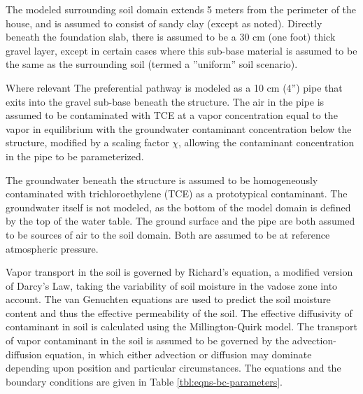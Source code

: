 \documentclass[journal=esthag,manuscript=article]{achemso}
\begin{document}
The modeled surrounding soil domain extends 5 meters from the perimeter of the house, and is assumed to consist of sandy clay (except as noted).
Directly beneath the foundation slab, there is assumed to be a 30 cm (one foot) thick gravel layer, except in certain cases where this sub-base material is assumed to be the same as the surrounding soil (termed  a ”uniform” soil scenario). \par

Where relevant The preferential pathway is modeled as a 10 cm (4”) pipe that exits into the gravel sub-base beneath the structure.
The air in the pipe is assumed to be contaminated with TCE at a vapor concentration equal to the vapor in equilibrium with the groundwater contaminant concentration below the structure, modified by a scaling factor $\chi$, allowing the contaminant concentration in the pipe to be parameterized. \par

The groundwater beneath the structure is assumed to be homogeneously contaminated with trichloroethylene (TCE) as a prototypical contaminant.
The groundwater itself is not modeled, as the bottom of the model domain is defined by the top of the water table.
The ground surface and the pipe are both assumed to be sources of air to the soil domain.
Both are assumed to be at reference atmospheric pressure. \par

Vapor transport in the soil is governed by Richard’s equation, a modified version  of Darcy’s Law, taking the variability of soil moisture in the vadose zone into account\cite{richards_capillary_1931}.
The van Genuchten equations are used to predict the soil moisture content and thus the effective permeability of the soil\cite{van_genuchten_closed-form_1980}.
The effective diffusivity of contaminant in soil is calculated using the Millington-Quirk model\cite{millington_permeability_1961}.
The transport of vapor contaminant in the soil is assumed to be governed by the advection-diffusion equation, in which either advection or diffusion may dominate depending upon position and particular circumstances.
The equations and the boundary conditions are given in Table \ref{tbl:eqns-bc-parameters}.
\end{document}
